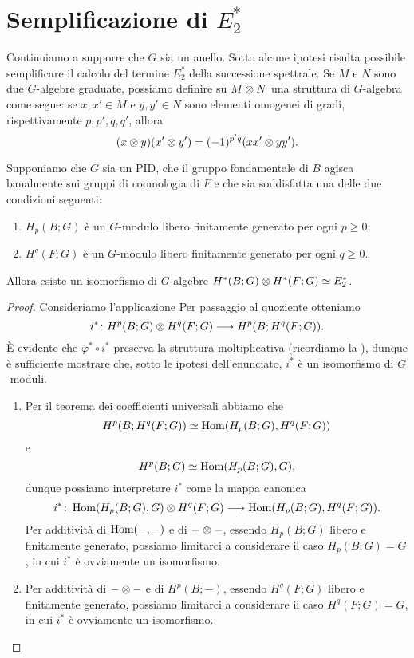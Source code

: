 \section{Semplificazione di \texorpdfstring{\(E^*_2\)}{E*2}}
Continuiamo a supporre che \(G\) sia un anello. Sotto alcune ipotesi risulta possibile semplificare il calcolo del termine \(E^\ast_2\) della successione spettrale. Se \(M\) e \(N\) sono due \(G\)-algebre graduate, possiamo definire su \(M\mathbin{\otimes} N\) una struttura di \(G\)-algebra come segue: se \(x,x'\in M\) e \(y,y'\in N\) sono elementi omogenei di gradi, rispettivamente \(p,p',q,q'\), allora
\[
(x\mathbin{\otimes} y)(x'\mathbin{\otimes} y')=(-1)^{p'q}(xx'\mathbin{\otimes} yy').
\]
\begin{proposition}
Supponiamo che \(G\) sia un PID, che il gruppo fondamentale di \(B\) agisca banalmente sui gruppi di coomologia di \(F\) e che sia soddisfatta una delle due condizioni seguenti:
\begin{enumerate}
\item \(H_p(B;G)\) è un \(G\)-modulo libero finitamente generato per ogni \(p\ge 0\);
\item \(H^q(F;G)\) è un \(G\)-modulo libero finitamente generato per ogni \(q\ge 0\).
\end{enumerate}
Allora esiste un isomorfismo di \(G\)-algebre \(H^*(B;G)\mathbin{\otimes} H^*(F;G)\simeq E^\ast_2\).
\end{proposition}
\begin{proof}
Consideriamo l'applicazione
Per passaggio al quoziente otteniamo
\[
\map{i^*}{H^p(B;G)\tensor H^q(F;G)}{H^p(B;H^q(F;G))}.
\]
È evidente che \(\varphi^*\circ i^*\) preserva la struttura moltiplicativa (ricordiamo la ), dunque è sufficiente mostrare che, sotto le ipotesi dell'enunciato, \(i^*\) è un isomorfismo di \(G\)-moduli.
\begin{enumerate}
\item Per il teorema dei coefficienti universali abbiamo che
\[
H^p(B;H^q(F;G))\simeq\operatorname{Hom}(H_p(B;G),H^q(F;G))
\]
e
\[
H^p(B;G)\simeq\operatorname{Hom}(H_p(B;G),G),
\]
dunque possiamo interpretare \(i^*\) come la mappa canonica
\[
\map{i^*}{\Hom(H_p(B;G),G)\tensor H^q(F;G)}{\Hom(H_p(B;G),H^q(F;G))}.
\]
Per additività di \(\operatorname{Hom}(-,-)\) e di \(-\mathbin{\otimes}-\), essendo \(H_p(B;G)\) libero e finitamente generato, possiamo limitarci a considerare il caso \(H_p(B;G)=G\), in cui \(i^*\) è ovviamente un isomorfismo.
\item Per additività di \(-\mathbin{\otimes}-\) e di \(H^p(B;-)\), essendo \(H^q(F;G)\) libero e finitamente generato, possiamo limitarci a considerare il caso \(H^q(F;G)=G\), in cui \(i^*\) è ovviamente un isomorfismo.\qedhere
\end{enumerate}
\end{proof}

